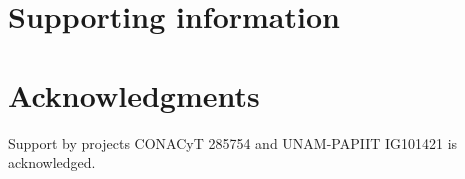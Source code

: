 \documentclass[10pt,letterpaper]{article} %
\begin{document}
\section*{Supporting information} %
\section*{Acknowledgments} %

\nolinenumbers

Support by projects CONACyT 285754 and UNAM-PAPIIT IG101421 is acknowledged. 



 


\begin{thebibliography}{10} %
%
%
% 




\end{thebibliography} %
\end{document}
